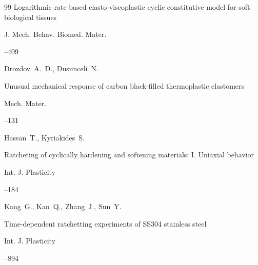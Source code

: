 \begin{thebibliography}{99}
\paper Logarithmic rate based elasto-viscoplastic cyclic constitutive model for soft biological tissues

\jour J. Mech. Behav. Biomed. Mater.



--409







\by Drozdov~A.~D., Dusunceli~N.

\paper Unusual mechanical response of carbon black-filled thermoplastic elastomers

\jour Mech. Mater.




--131







\by Hassan~T., Kyriakides~S.

\paper Ratcheting of cyclically hardening and softening materials: I. Uniaxial behavior 

\jour Int. J. Plasticity




--184







\by Kang~G., Kan~Q., Zhang~J., Sun~Y.

\paper Time-dependent ratchetting experiments of SS304 stainless steel

\jour Int. J. Plasticity




--894







\end{thebibliography}
